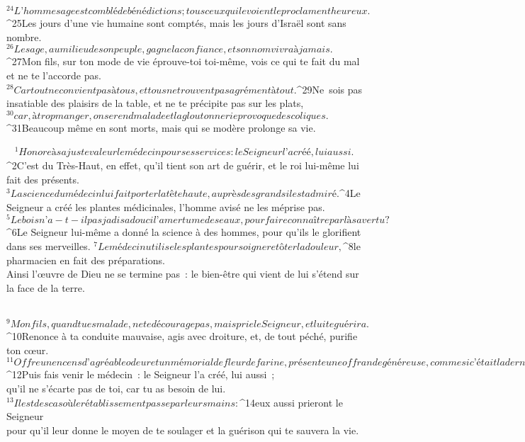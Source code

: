 ${}^{24}L’homme sage est comblé de bénédictions ;
        tous ceux qui le voient le proclament heureux.
${}^{25}Les jours d’une vie humaine sont comptés,
        mais les jours d’Israël sont sans nombre.
${}^{26}Le sage, au milieu de son peuple, gagne la confiance,
        et son nom vivra à jamais.
${}^{27}Mon fils, sur ton mode de vie éprouve-toi toi-même,
        vois ce qui te fait du mal et ne te l’accorde pas.
${}^{28}Car tout ne convient pas à tous,
        et tous ne trouvent pas agrément à tout.
${}^{29}Ne sois pas insatiable des plaisirs de la table,
        et ne te précipite pas sur les plats,
${}^{30}car, à trop manger, on se rend malade
        et la gloutonnerie provoque des coliques.
${}^{31}Beaucoup même en sont morts,
        mais qui se modère prolonge sa vie.
      
         
      \bchapter{}
${}^{1}Honore à sa juste valeur le médecin pour ses services :
        le Seigneur l’a créé, lui aussi.
${}^{2}C’est du Très-Haut, en effet, qu’il tient son art de guérir,
        et le roi lui-même lui fait des présents.
${}^{3}La science du médecin lui fait porter la tête haute,
        auprès des grands il est admiré.
${}^{4}Le Seigneur a créé les plantes médicinales,
        l’homme avisé ne les méprise pas.
${}^{5}Le bois n’a-t-il pas jadis adouci l’amertume des eaux,
        pour faire connaître par là sa vertu ?
${}^{6}Le Seigneur lui-même a donné la science à des hommes,
        pour qu’ils le glorifient dans ses merveilles.
${}^{7}Le médecin utilise les plantes pour soigner et ôter la douleur,
${}^{8}le pharmacien en fait des préparations.
        \\Ainsi l’œuvre de Dieu ne se termine pas :
        le bien-être qui vient de lui s’étend sur la face de la terre.
        
           
         
${}^{9}Mon fils, quand tu es malade, ne te décourage pas,
        mais prie le Seigneur, et lui te guérira.
${}^{10}Renonce à ta conduite mauvaise, agis avec droiture,
        et, de tout péché, purifie ton cœur.
${}^{11}Offre un encens d’agréable odeur et un mémorial de fleur de farine,
        présente une offrande généreuse, comme si c’était la dernière.
${}^{12}Puis fais venir le médecin :
        le Seigneur l’a créé, lui aussi ;
        \\qu’il ne s’écarte pas de toi,
        car tu as besoin de lui.
${}^{13}Il est des cas où le rétablissement passe par leurs mains :
${}^{14}eux aussi prieront le Seigneur
        \\pour qu’il leur donne le moyen de te soulager
        et la guérison qui te sauvera la vie.
        
